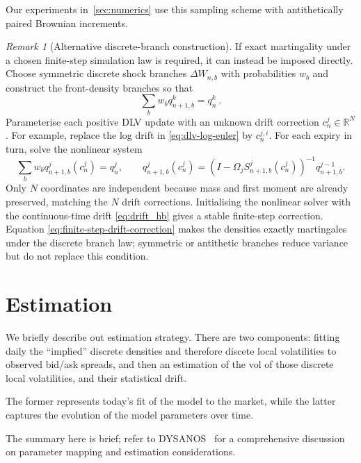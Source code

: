 \documentclass[11pt]{article}
\theoremstyle{plain}
\theoremstyle{definition}
\theoremstyle{remark}
\newtheorem{remark}[theorem]{Remark}
\begin{document}
Our experiments in~\ref{sec:numerics} use this sampling scheme with antithetically paired Brownian increments.

\begin{remark}[Alternative discrete-branch construction]
\label{rem:discrete-branch-sampling}
If exact martingality under a chosen finite-step simulation law is required,
it can instead be imposed directly. Choose symmetric discrete shock branches
$\Delta W_{n,b}$ with probabilities $w_b$ and construct the front-density
branches so that
\[
\sum_b w_bq_{n+1,b}^k=q_n^k \ .
\]
Parameterise each positive DLV update with an unknown drift correction
$c_n^j\in\mathbb R^N$. For example, replace the log drift in
\eqref{eq:dlv-log-euler} by $c_n^{j,i}$. For each expiry in turn, solve the
nonlinear system
\begin{equation}
\label{eq:finite-step-drift-correction}
\sum_b w_b q_{n+1,b}^j(c_n^j)=q_n^j,
\qquad
q_{n+1,b}^j(c_n^j)
=\left(I-\Omega_jS_{n+1,b}^j(c_n^j)\right)^{-1}
q_{n+1,b}^{j-1}.
\end{equation}
Only $N$ coordinates are independent because mass and first moment are
already preserved, matching the $N$ drift corrections. Initialising the
nonlinear solver with the continuous-time drift
\eqref{eq:drift_hb} gives
a stable finite-step correction. Equation
\eqref{eq:finite-step-drift-correction} makes the densities exactly
martingales under the discrete branch law; symmetric or antithetic branches
reduce variance but do not replace this condition.

\end{remark}

\section{Estimation}\label{sec:estimation}

We briefly describe out estimation strategy. There are two components: fitting daily the ``implied'' discrete densities and therefore discete local volatilities
to observed bid/ask spreads, and then an estimation of the vol of those discrete local volatilities, and their statistical drift.

The former represents today's fit of the model to the market, while the latter captures the evolution of the model parameters over time.

The summary here is brief; refer
to DYSANOS~\cite{DYSANOS2026} for a comprehensive discussion on parameter mapping and estimation considerations.
\end{document}

